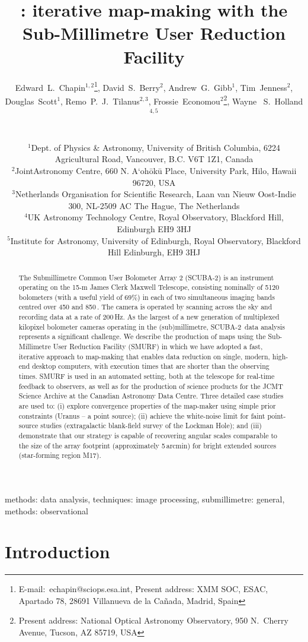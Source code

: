 \documentclass[useAMS,usenatbib,nofootinbib]{mn2e}
\title[\scuba: iterative map-making with SMURF]{\scuba: iterative map-making
with the Sub-Millimetre User Reduction Facility}
\author[Edward~L.~Chapin~et~al.]{
  \parbox[t]{\textwidth}{
    Edward~L.~Chapin$^{1,2}$\thanks{E-mail:~echapin@sciops.esa.int,
      Present address: XMM SOC, ESAC, Apartado 78, 28691 Villanueva de
      la Ca\~nada, Madrid, Spain},
    David~S.~Berry$^{2}$,
    Andrew~G.~Gibb$^{1}$,
    Tim~Jenness$^{2}$,
    Douglas~Scott$^{1}$,
    Remo~P.~J.~Tilanus$^{2,3}$,
    Frossie~Economou$^2$\thanks{Present address: National Optical
      Astronomy Observatory, 950 N.\ Cherry Avenue, Tucson, AZ 85719,
      USA},
    Wayne ~S.~Holland$^{4,5}$
  }
  \\
  \\
  $^{1}$Dept. of Physics \& Astronomy, University of British Columbia,
  6224 Agricultural Road, Vancouver, B.C. V6T 1Z1, Canada\\
  $^{2}$JointAstronomy Centre, 660 N. A`oh\={o}k\={u} Place, University
  Park, Hilo, Hawaii 96720, USA\\
  $^{3}$Netherlands Organisation for Scientific Research,
  Laan van Nieuw Oost-Indie 300, NL-2509 AC The Hague, The Netherlands\\
  $^{4}$UK Astronomy Technology Centre, Royal Observatory, Blackford
  Hill, Edinburgh EH9 3HJ\\
  $^{5}$Institute for Astronomy, University of Edinburgh, Royal Observatory, Blackford Hill Edinburgh, EH9 3HJ}
\newcommand{\scuba}{SCUBA-2}
\begin{document}
\label{firstpage}

\maketitle

\begin{abstract}
  The Submillimetre Common User Bolometer Array 2 (\scuba) is an
  instrument operating on the 15-m James Clerk Maxwell Telescope,
  consisting nominally of 5120 bolometers (with a useful yield of
  69\%) in each of two simultaneous imaging bands centred over 450 and
  850\,\micron. The camera is operated by scanning across the sky and
  recording data at a rate of 200\,Hz. As the largest of a new
  generation of multiplexed kilopixel bolometer cameras operating in
  the (sub)millimetre, \scuba\ data analysis represents a significant
  challenge.  We describe the production of maps using the
  Sub-Millimetre User Reduction Facility (SMURF) in which we have
  adopted a fast, iterative approach to map-making that enables data
  reduction on single, modern, high-end desktop computers, with
  execution times that are shorter than the observing times.  SMURF is
  used in an automated setting, both at the telescope for real-time
  feedback to observers, as well as for the production of science
  products for the JCMT Science Archive at the Canadian Astronomy Data
  Centre. Three detailed case studies are used to: (i) explore
  convergence properties of the map-maker using simple prior
  constraints (Uranus -- a point source); (ii) achieve the white-noise
  limit for faint point-source studies (extragalactic blank-field
  survey of the Lockman Hole); and (iii) demonstrate that our strategy
  is capable of recovering angular scales comparable to the size of
  the array footprint (approximately 5\,arcmin) for bright extended
  sources (star-forming region M17).
\end{abstract}


\begin{keywords}
methods: data analysis, techniques: image processing, submillimetre:
general, methods: observational
\end{keywords}

\section{Introduction}
\label{sec:intro}
\end{document}
